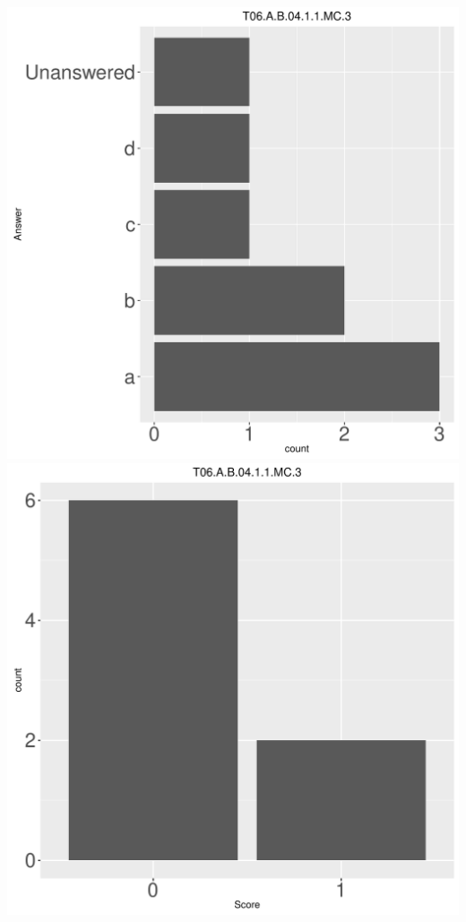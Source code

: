 \documentclass[12pt,english,nohyper]{tufte-handout}\usepackage[]{graphicx}\usepackage[]{color}
\begin{document}
\begin{center} \includegraphics[width=.45\linewidth]{Topic06_AB_7_answer} \includegraphics[width=.45\linewidth]{Topic06_AB_7_score} \end{center} 
\end{document}
